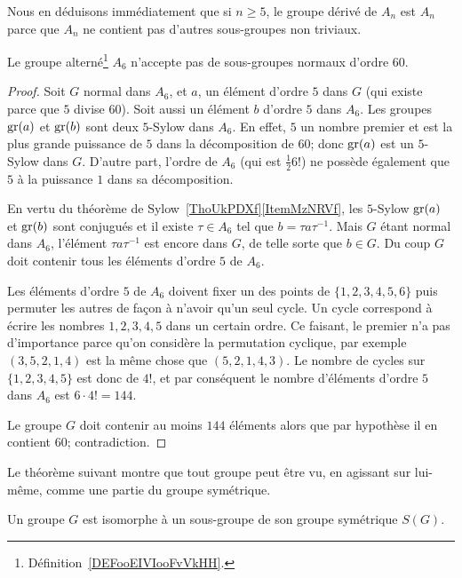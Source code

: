 Nous en déduisons immédiatement que si \( n\geq 5\), le groupe dérivé de \( A_n\) est \( A_n\) parce que \( A_n\) ne contient pas d'autres sous-groupes non triviaux.

\begin{lemma}       \label{LEMooICEHooGSSpkq}
    Le groupe alterné\footnote{Définition~\ref{DEFooEIVIooFvVkHH}.} \( A_6\) n'accepte pas de sous-groupes normaux d'ordre \( 60\).
\end{lemma}

\begin{proof}
    Soit \( G\) normal dans \( A_6\), et \( a\), un élément d'ordre \( 5\) dans \( G\) (qui existe parce que \( 5\) divise \( 60\)). Soit aussi un élément \( b\) d'ordre \( 5\) dans \( A_6\). Les groupes \( \operatorname{gr}(a)\) et \( \operatorname{gr}(b)\) sont deux \( 5\)-Sylow dans \( A_6\). En effet, \( 5\) un nombre premier et est la plus grande puissance de \( 5\) dans la décomposition de \( 60\); donc \( \operatorname{gr}(a)\) est un \( 5\)-Sylow dans \( G\). D'autre part, l'ordre de \( A_6\) (qui est \( \frac{ 1 }{2}6!\)) ne possède également que \( 5\) à la puissance \( 1\) dans sa décomposition.

    En vertu du théorème de Sylow~\ref{ThoUkPDXf}\ref{ItemMzNRVf}, les \( 5\)-Sylow \( \operatorname{gr}(a)\) et \( \operatorname{gr}(b)\) sont conjugués et il existe \( \tau\in A_6\) tel que \( b=\tau a\tau^{-1}\). Mais \( G\) étant normal dans \( A_6\), l'élément \( \tau a\tau^{-1}\) est encore dans \( G\), de telle sorte que \( b\in G\). Du coup \( G\) doit contenir tous les éléments d'ordre \( 5\) de \( A_6\).

    Les éléments d'ordre $5$ de \( A_6\) doivent fixer un des points de \( \{ 1,2,3,4,5,6 \}\) puis permuter les autres de façon à n'avoir qu'un seul cycle. Un cycle correspond à écrire les nombres \( 1,2,3,4,5\) dans un certain ordre. Ce faisant, le premier n'a pas d'importance parce qu'on considère la permutation cyclique, par exemple \( (3,5,2,1,4)\) est la même chose que \( (5,2,1,4,3)\). Le nombre de cycles sur \( \{ 1,2,3,4,5 \}\) est donc de \( 4!\), et par conséquent le nombre d'éléments d'ordre \( 5\) dans \( A_6\) est \( 6\cdot 4!=144\).

    Le groupe \( G\) doit contenir au moins \( 144\) éléments alors que par hypothèse il en contient \( 60\); contradiction.
\end{proof}

Le théorème suivant montre que tout groupe peut être vu, en agissant sur lui-même, comme une partie du groupe symétrique.
\begin{theorem}
    Un groupe \( G\) est isomorphe à un sous-groupe de son groupe symétrique \( S(G)\).
\end{theorem}

